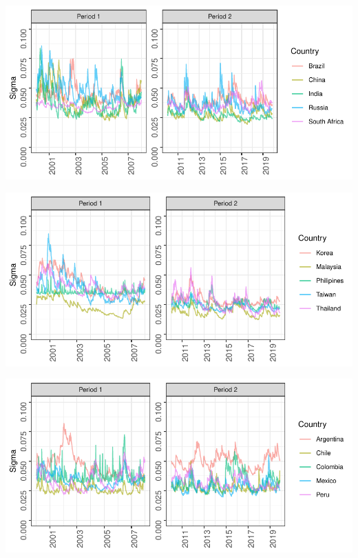 \documentclass[11pt,preprint, authoryear]{elsarticle}
\let\origfigure\figure
\let\endorigfigure\endfigure
\renewenvironment{figure}[1][2] {
    \expandafter\origfigure\expandafter[H]
} {
    \endorigfigure
}
\numberwithin{equation}{section}
\numberwithin{figure}{section}
\numberwithin{table}{section}
\begin{document}
\begin{figure}[H]

{\centering \includegraphics{Template_files/figure-latex/volplotbrics-1} 

}

\caption{BRICS conditional volatility \label{bricsvol}}\label{fig:volplotbrics}
\end{figure}

\begin{figure}[H]

{\centering \includegraphics{Template_files/figure-latex/vol2-1} 

}

\caption{Asia Conditional Volatility \label{vol.asia}}\label{fig:vol2}
\end{figure}

\begin{figure}[H]

{\centering \includegraphics{Template_files/figure-latex/vol3-1} 

}

\caption{Latin America Conditional Volatility \label{vol.south.america}}\label{fig:vol3}
\end{figure}
\end{document}

